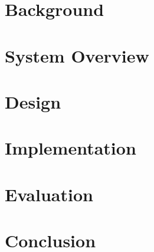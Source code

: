 \documentclass[nonacm,sigplan]{acmart}
\begin{document}
\section{Background}


\section{System Overview}


\section{Design}


\section{Implementation}


\section{Evaluation}

\label{sec:eva}




\section{Conclusion}







\end{document}
